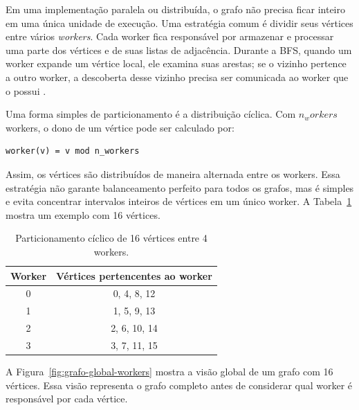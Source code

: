 Em uma implementação paralela ou distribuída, o grafo não precisa ficar inteiro
em uma única unidade de execução. Uma estratégia comum é dividir seus vértices entre vários
\textit{workers}. Cada worker fica responsável por armazenar e processar uma
parte dos vértices e de suas listas de adjacência. Durante a BFS, quando um
worker expande um vértice local, ele examina suas arestas; se o vizinho pertence
a outro worker, a descoberta desse vizinho precisa ser comunicada ao worker que
o possui \cite{merrillgpu}.

Uma forma simples de particionamento é a distribuição cíclica. Com $n_workers$
workers, o dono de um vértice pode ser calculado por:

\begin{lstlisting}
worker(v) = v mod n_workers
\end{lstlisting}

Assim, os vértices são distribuídos de maneira alternada entre os workers. Essa
estratégia não garante balanceamento perfeito para todos os grafos, mas é simples
e evita concentrar intervalos inteiros de vértices em um único worker. A
Tabela~\ref{tab:worker-partition} mostra um exemplo com 16 vértices.

\begin{table}[H]
\centering
\begin{tabular}{c|c}
Worker & Vértices pertencentes ao worker \\
\hline
0 & 0, 4, 8, 12 \\
1 & 1, 5, 9, 13 \\
2 & 2, 6, 10, 14 \\
3 & 3, 7, 11, 15 \\
\end{tabular}
\caption{Particionamento cíclico de 16 vértices entre 4 workers.}
\label{tab:worker-partition}
\end{table}

A Figura~\ref{fig:grafo-global-workers} mostra a visão global de um grafo com 16
vértices. Essa visão representa o grafo completo antes de considerar qual worker
é responsável por cada vértice.

